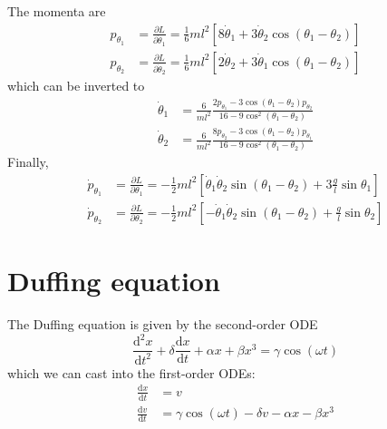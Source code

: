 \documentclass{report}
\begin{document}
The momenta are
\begin{align}
  p_{\theta_1} &= \frac{\partial L}{\partial \dot{\theta}_1} = \frac{1}{6} ml^2 \left[8 \dot{\theta}_1 + 3 \dot{\theta}_2 \cos(\theta_1 - \theta_2) \right] \\
  p_{\theta_2} &= \frac{\partial L}{\partial \dot{\theta}_2} = \frac{1}{6} ml^2 \left[2 \dot{\theta}_2 + 3 \dot{\theta}_1 \cos(\theta_1 - \theta_2) \right]
\end{align}
which can be inverted to
\begin{align}
  \dot{\theta}_1 &= \frac{6}{ml^2} \frac{2 p_{\theta_1} - 3 \cos(\theta_1 - \theta_2) p_{\theta_2}}{16 - 9 \cos^2(\theta_1 - \theta_2)} \\
  \dot{\theta}_2 &= \frac{6}{ml^2} \frac{8 p_{\theta_2} - 3 \cos(\theta_1 - \theta_2) p_{\theta_1}}{16 - 9 \cos^2(\theta_1 - \theta_2)}
\end{align}
Finally,
\begin{align}
  \dot{p}_{\theta_1} &= \frac{\partial L}{\partial\theta_1} = - \frac{1}{2} ml^2 \left[\dot{\theta}_1 \dot{\theta}_2 \sin(\theta_1 - \theta_2) + 3 \frac{g}{l} \sin\theta_1 \right] \\
  \dot{p}_{\theta_2} &= \frac{\partial L}{\partial\theta_2} = - \frac{1}{2} ml^2 \left[- \dot{\theta}_1 \dot{\theta}_2 \sin(\theta_1 - \theta_2) + \frac{g}{l} \sin\theta_2 \right]
\end{align}


\chapter{Duffing equation}

The Duffing equation is given by the second-order ODE
\begin{equation}
  \frac{\mathrm{d}^2x}{\mathrm{d}t^2} + \delta \frac{\mathrm{d}x}{\mathrm{d}t} + \alpha x + \beta x^3 = \gamma \cos(\omega t)
\end{equation}
which we can cast into the first-order ODEs:
\begin{align}
  \frac{\mathrm{d}x}{\mathrm{d}t} &= v \\
  \frac{\mathrm{d}v}{\mathrm{d}t} &= \gamma \cos(\omega t) - \delta v - \alpha x - \beta x^3
\end{align}

\end{document}
